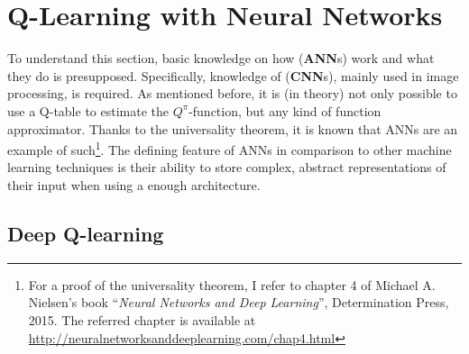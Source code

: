 %


\section{Q-Learning with Neural Networks}

To understand this section, basic knowledge on how  (\textbf{ANN}s) work and what they do is presupposed. Specifically, knowledge of  (\textbf{CNN}s)\cite{yann_lecun_gradient-based_1998}, mainly used in image processing, is required. As mentioned before, it is (in theory) not only possible to use a Q-table to estimate the $Q^\pi$-function, but any kind of function approximator. Thanks to the universality theorem, it is known that ANNs are an example of such\footnote{For a proof of the universality theorem, I refer to chapter 4 of Michael A. Nielsen's book ``\textit{Neural Networks and Deep Learning}'', Determination Press, 2015. The referred chapter is available at \url{http://neuralnetworksanddeeplearning.com/chap4.html}}. The defining feature of ANNs in comparison to other machine learning techniques is their ability to store complex, abstract representations of their input when using a  enough architecture.

\subsection{Deep Q-learning} \label{ch:DQN}

